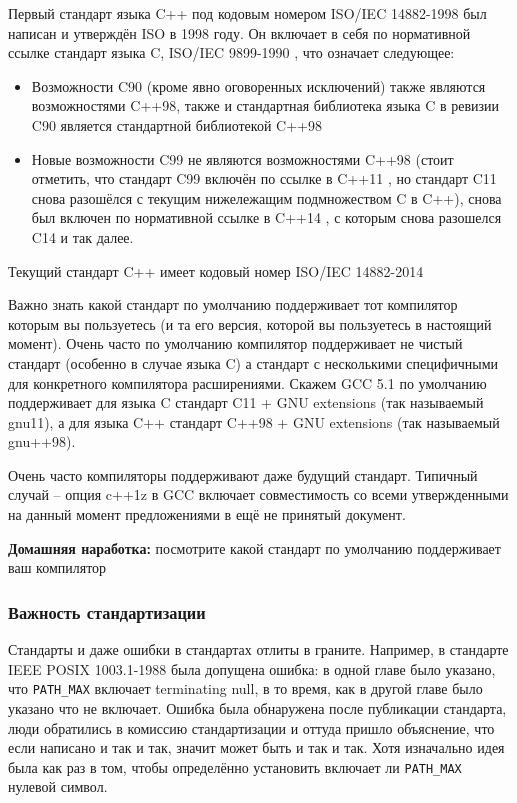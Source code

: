 \documentclass[a4paper,12pt,oneside]{article}
\begin{document}
Первый стандарт языка C++ под кодовым номером ISO/IEC 14882-1998 \cite{stdcpp98} был написан и утверждён ISO в 1998 году. Он включает в себя по нормативной ссылке стандарт языка C, ISO/IEC 9899-1990 \cite{stdc90}, что означает следующее: 

\begin{itemize}
\item
Возможности C90 (кроме явно оговоренных исключений) также являются возможностями C++98, также и стандартная библиотека языка C в ревизии C90 является стандартной библиотекой C++98
\item
Новые возможности C99 \cite{stdc90} не являются возможностями C++98 (стоит отметить, что стандарт C99 включён по ссылке в C++11 \cite{stdcpp11}, но стандарт C11 \cite{stdc11} снова разошёлся с текущим нижележащим подмножеством C в C++), снова был включен по нормативной ссылке в C++14 \cite{stdcpp14}, с которым снова разошелся C14 и так далее.
\end{itemize}

Текущий стандарт C++ имеет кодовый номер ISO/IEC 14882-2014

Важно знать какой стандарт по умолчанию поддерживает тот компилятор которым вы пользуетесь (и та его версия, которой вы пользуетесь в настоящий момент). Очень часто по умолчанию компилятор поддерживает не чистый стандарт (особенно в случае языка C) а стандарт с несколькими специфичными для конкретного компилятора расширениями. Скажем GCC 5.1 по умолчанию поддерживает для языка C стандарт C11 + GNU extensions (так называемый gnu11), а для языка C++ стандарт C++98 + GNU extensions (так называемый gnu++98).

Очень часто компиляторы поддерживают даже будущий стандарт. Типичный случай -- опция c++1z в GCC включает совместимость со всеми утвержденными на данный момент предложениями в ещё не принятый документ.

\textbf{Домашняя наработка:} посмотрите какой стандарт по умолчанию поддерживает ваш компилятор

\subsubsection{Важность стандартизации}\label{StandartizationImportance}

Стандарты и даже ошибки в стандартах отлиты в граните. Например, в стандарте IEEE POSIX 1003.1-1988 была допущена ошибка: в одной главе было указано, что \lstinline!PATH_MAX! включает terminating null, в то время, как в другой главе было указано что не включает. Ошибка была обнаружена после публикации стандарта, люди обратились в комиссию стандартизации и оттуда пришло объяснение, что если написано и так и так, значит может быть и так и так. Хотя изначально идея была как раз в том, чтобы определённо установить включает ли \lstinline!PATH_MAX! нулевой символ.
\end{document}
